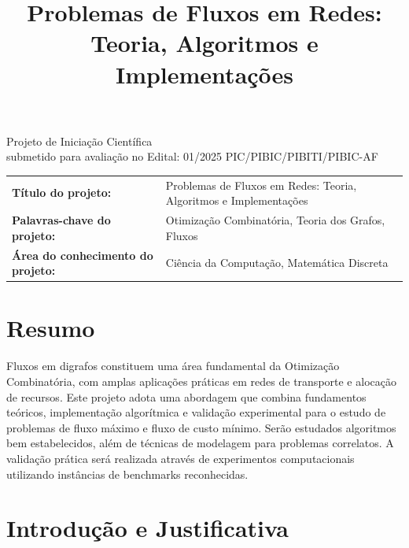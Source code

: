 \documentclass{amsart}
\newcommand{\numedital}{01/2025 PIC/PIBIC/PIBITI/PIBIC-AF}
\newcommand{\longtitle}{Problemas de Fluxos em Redes: Teoria, Algoritmos e Implementações}
\begin{document}
\title[Problemas de Fluxos em Redes]{\longtitle}
\maketitle
\thispagestyle{empty}
\vfill

\begin{flushright}
\begin{minipage}{8cm}
\begin{flushright}
Projeto de Iniciação Científica\\submetido para avaliação no Edital: \numedital
\end{flushright}
\end{minipage}
\end{flushright}

\vfill

\renewcommand{\arraystretch}{2}
\begin{tabular}{ll}
\textbf{Título do projeto:} &
\begin{minipage}[t]{8cm}
\longtitle
\end{minipage}
\\
 \textbf{Palavras-chave do projeto:} &
 \begin{minipage}[t]{8cm}
 Otimização Combinatória, Teoria dos Grafos, Fluxos
 \end{minipage}\\
\textbf{Área do conhecimento do projeto:} &
\begin{minipage}[t]{8cm}
Ciência da Computação, Matemática Discreta
\end{minipage}
\end{tabular}
\newpage

\tableofcontents

\section{Resumo}
Fluxos em digrafos constituem uma área fundamental da Otimização Combinatória, com amplas aplicações práticas em redes de transporte e alocação de recursos. Este projeto adota uma abordagem que combina fundamentos teóricos, implementação algorítmica e validação experimental para o estudo de problemas de fluxo máximo e fluxo de custo mínimo. Serão estudados algoritmos bem estabelecidos, além de técnicas de modelagem para problemas correlatos. A validação prática será realizada através de experimentos computacionais utilizando instâncias de benchmarks reconhecidas.

\section{Introdução e Justificativa}
\end{document}
